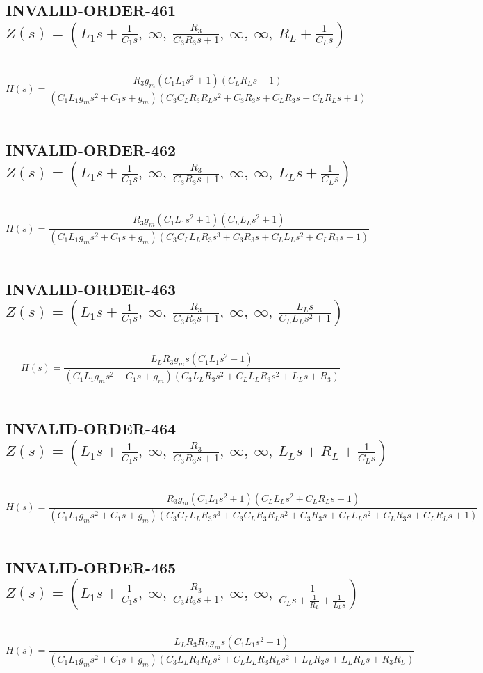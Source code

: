 \documentclass{article}
\begin{document}
\subsection{INVALID-ORDER-461 $Z(s) = \left( L_{1} s + \frac{1}{C_{1} s}, \  \infty, \  \frac{R_{3}}{C_{3} R_{3} s + 1}, \  \infty, \  \infty, \  R_{L} + \frac{1}{C_{L} s}\right)$ } \ 
\textbf{\[H(s) = \frac{R_{3} g_{m} \left(C_{1} L_{1} s^{2} + 1\right) \left(C_{L} R_{L} s + 1\right)}{\left(C_{1} L_{1} g_{m} s^{2} + C_{1} s + g_{m}\right) \left(C_{3} C_{L} R_{3} R_{L} s^{2} + C_{3} R_{3} s + C_{L} R_{3} s + C_{L} R_{L} s + 1\right)}\] } \ 
\subsection{INVALID-ORDER-462 $Z(s) = \left( L_{1} s + \frac{1}{C_{1} s}, \  \infty, \  \frac{R_{3}}{C_{3} R_{3} s + 1}, \  \infty, \  \infty, \  L_{L} s + \frac{1}{C_{L} s}\right)$ } \ 
\textbf{\[H(s) = \frac{R_{3} g_{m} \left(C_{1} L_{1} s^{2} + 1\right) \left(C_{L} L_{L} s^{2} + 1\right)}{\left(C_{1} L_{1} g_{m} s^{2} + C_{1} s + g_{m}\right) \left(C_{3} C_{L} L_{L} R_{3} s^{3} + C_{3} R_{3} s + C_{L} L_{L} s^{2} + C_{L} R_{3} s + 1\right)}\] } \ 
\subsection{INVALID-ORDER-463 $Z(s) = \left( L_{1} s + \frac{1}{C_{1} s}, \  \infty, \  \frac{R_{3}}{C_{3} R_{3} s + 1}, \  \infty, \  \infty, \  \frac{L_{L} s}{C_{L} L_{L} s^{2} + 1}\right)$ } \ 
\textbf{\[H(s) = \frac{L_{L} R_{3} g_{m} s \left(C_{1} L_{1} s^{2} + 1\right)}{\left(C_{1} L_{1} g_{m} s^{2} + C_{1} s + g_{m}\right) \left(C_{3} L_{L} R_{3} s^{2} + C_{L} L_{L} R_{3} s^{2} + L_{L} s + R_{3}\right)}\] } \ 
\subsection{INVALID-ORDER-464 $Z(s) = \left( L_{1} s + \frac{1}{C_{1} s}, \  \infty, \  \frac{R_{3}}{C_{3} R_{3} s + 1}, \  \infty, \  \infty, \  L_{L} s + R_{L} + \frac{1}{C_{L} s}\right)$ } \ 
\textbf{\[H(s) = \frac{R_{3} g_{m} \left(C_{1} L_{1} s^{2} + 1\right) \left(C_{L} L_{L} s^{2} + C_{L} R_{L} s + 1\right)}{\left(C_{1} L_{1} g_{m} s^{2} + C_{1} s + g_{m}\right) \left(C_{3} C_{L} L_{L} R_{3} s^{3} + C_{3} C_{L} R_{3} R_{L} s^{2} + C_{3} R_{3} s + C_{L} L_{L} s^{2} + C_{L} R_{3} s + C_{L} R_{L} s + 1\right)}\] } \ 
\subsection{INVALID-ORDER-465 $Z(s) = \left( L_{1} s + \frac{1}{C_{1} s}, \  \infty, \  \frac{R_{3}}{C_{3} R_{3} s + 1}, \  \infty, \  \infty, \  \frac{1}{C_{L} s + \frac{1}{R_{L}} + \frac{1}{L_{L} s}}\right)$ } \ 
\textbf{\[H(s) = \frac{L_{L} R_{3} R_{L} g_{m} s \left(C_{1} L_{1} s^{2} + 1\right)}{\left(C_{1} L_{1} g_{m} s^{2} + C_{1} s + g_{m}\right) \left(C_{3} L_{L} R_{3} R_{L} s^{2} + C_{L} L_{L} R_{3} R_{L} s^{2} + L_{L} R_{3} s + L_{L} R_{L} s + R_{3} R_{L}\right)}\] } \ 
\end{document}
